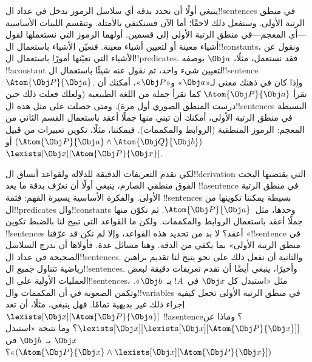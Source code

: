 \documentclass[../../../include/open-logic-section]{subfiles}
\begin{document}


ينبغي أولًا أن نحدد بدقة أي سلاسل الرموز تدخل في عداد ال!!{sentence}s في منطق
الرتبة الأولى. وسنفعل ذلك لاحقًا؛ أما الآن فسنكتفي بالأمثلة. وتنقسم
اللبنات الأساسية---أي المعجم---في منطق الرتبة الأولى إلى قسمين. أولهما
الرموز التي نستعملها لقول أشياء معينة أو لتعيين أشياء معينة. فنعيّن
الأشياء باستعمال ال!!{constant}s، ونقول عن الأشياء التي نعيّنها أمورًا
باستعمال ال!!{predicate}s. فقد نستعمل، مثلًا، $\Obj a$ بوصفه
!!a{constant} لتعيين شيء واحد، ثم نقول عنه شيئًا باستعمال
ال!!{sentence}~$\Atom{\Obj P}{\Obj a}$. وإذا كان في ذهنك معنى
لـ«$\Obj a$» و«$\Obj P$»، أمكنك أن تقرأ
$\Atom{\Obj P}{\Obj a}$ كما تقرأ جملة من اللغة الطبيعية (ولعلك فعلت
ذلك حين درست المنطق الصوري أول مرة). ومتى حصلت على مثل هذه
ال!!{sentence}s البسيطة في منطق الرتبة الأولى، أمكنك أن تبني منها جملًا
أعقد باستعمال القسم الثاني من المعجم: الرموز المنطقية (الروابط
والمكممات). فيمكننا، مثلًا، تكوين تعبيرات من قبيل
$(\Atom{\Obj P}{\Obj a} \land \Atom{\Obj Q}{\Obj b})$
أو~$\lexists[\Obj x][\Atom{\Obj P}{\Obj x}]$.

لكي نقدم التعريفات الدقيقة للدلالة ولقواعد أنساق ال!!{derivation} التي
يقتضيها البحث الفوق منطقي الصارم، ينبغي أولًا أن نعرّف بدقة ما يعد
!!a{sentence} في منطق الرتبة الأولى. والفكرة الأساسية يسيرة الفهم:
فثمة !!{sentence}s بسيطة يمكننا تكوينها من ال!!{predicate}s
وال!!{constant}s وحدها، مثل~$\Atom{\Obj P}{\Obj a}$. ثم نكوّن منها
جملًا أعقد باستعمال الروابط والمكممات. ولكن ما القواعد التي تبيح لنا
بالضبط تكوين !!{sentence}s أعقد؟ لا بد من تحديد هذه القواعد، وإلا لم
نكن قد عرّفنا «!!{sentence} في منطق الرتبة الأولى» بما يكفي من الدقة.
وهنا مسائل عدة. فأولاها أن ندرج السلاسل الصحيحة في عداد ال!!{sentence}s. والثانية
أن نفعل ذلك على نحو يتيح لنا تقديم براهين رياضية تتناول
\emph{جميع} ال!!{sentence}s. وأخيرًا، ينبغي أيضًا أن نقدم تعريفات دقيقة
لبعض العمليات الأولية على ال!!{sentence}s، مثل «استبدل كل $\Obj x$
في~$!A$ بـ~$\Obj b$». وتكمن الصعوبة في أن المكممات وال!!{variable}s
في منطق الرتبة الأولى تجعل كيفية إجراء ذلك غير بديهية تمامًا. فهل ينبغي،
مثلًا، أن تعد $\lexists[\Obj x][\Atom{\Obj P}{\Obj a}]$
!!a{sentence}؟ وماذا عن
$\lexists[\Obj x][\lexists[\Obj x][\Atom{\Obj P}{\Obj x}]]$؟ وما
نتيجة «استبدل $\Obj x$ بـ~$\Obj b$ في
$(\Atom{\Obj P}{\Obj x} \land
\lexists[\Obj x][\Atom{\Obj P}{\Obj x}])$»؟
\end{document}
